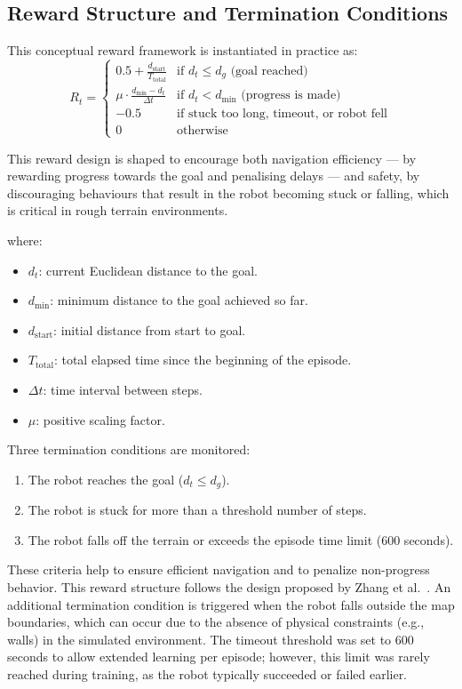 \documentclass[conference]{IEEEtran}
\begin{document}
\subsection{Reward Structure and Termination Conditions}

This conceptual reward framework is instantiated in practice as:
\[
R_t = 
\begin{cases}
0.5 + \frac{d_{\text{start}}}{T_{\text{total}}} & \text{if } d_t \leq d_g \text{ (goal reached)} \\
\mu \cdot \frac{d_{\min} - d_t}{\Delta t} & \text{if } d_t < d_{\min} \text{ (progress is made)} \\
-0.5 & \text{if stuck too long, timeout, or robot fell} \\
0 & \text{otherwise}
\end{cases}
\]


This reward design is shaped to encourage both navigation efficiency — by rewarding progress towards the goal and penalising delays — and safety, by discouraging behaviours that result in the robot becoming stuck or falling, which is critical in rough terrain environments.

where:
\begin{itemize}
    \item \( d_t \): current Euclidean distance to the goal.
    \item \( d_{\min} \): minimum distance to the goal achieved so far.
    \item \( d_{\text{start}} \): initial distance from start to goal.
    \item \( T_{\text{total}} \): total elapsed time since the beginning of the episode.
    \item \( \Delta t \): time interval between steps.
    \item \( \mu \): positive scaling factor.
\end{itemize}

Three termination conditions are monitored:
\begin{enumerate}
    \item The robot reaches the goal (\( d_t \leq d_g \)).
    \item The robot is stuck for more than a threshold number of steps.
    \item The robot falls off the terrain or exceeds the episode time limit (600 seconds).
\end{enumerate}

These criteria help to ensure efficient navigation and to penalize non-progress behavior. This reward structure follows the design proposed by Zhang et al.~\cite{Zhang2018DRL}.
An additional termination condition is triggered when the robot falls outside the map boundaries, which can occur due to the absence of physical constraints (e.g., walls) in the simulated environment. The timeout threshold was set to 600 seconds to allow extended learning per episode; however, this limit was rarely reached during training, as the robot typically succeeded or failed earlier.
\end{document}
